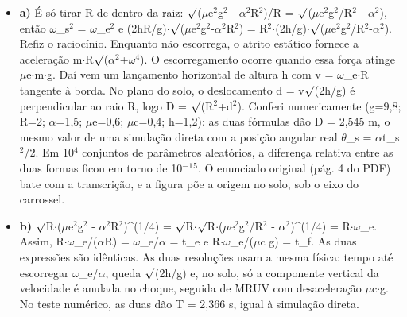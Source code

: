 \documentclass{article}%
\begin{document}
\begin{itemize}%
\item%
\textbf{a)} É só tirar R de dentro da raiz: $\surd$($\mu$e$^2$g$^2$ - $\alpha$$^2$R$^2$)/R = $\surd$($\mu$e$^2$g$^2$/R$^2$ - $\alpha$$^2$), então $\omega$\_s$^2$ = $\omega$\_e$^2$ e (2hR/g)$\cdot$$\surd$($\mu$e$^2$g$^2$-$\alpha$$^2$R$^2$) = R$^2$$\cdot$(2h/g)$\cdot$$\surd$($\mu$e$^2$g$^2$/R$^2$-$\alpha$$^2$). Refiz o raciocínio. Enquanto não escorrega, o atrito estático fornece a aceleração m$\cdot$R$\surd$($\alpha$$^2$+$\omega$$^{4}$). O escorregamento ocorre quando essa força atinge $\mu$e$\cdot$m$\cdot$g. Daí vem um lançamento horizontal de altura h com v = $\omega$\_e$\cdot$R tangente à borda. No plano do solo, o deslocamento d = v$\surd$(2h/g) é perpendicular ao raio R, logo D = $\surd$(R$^2$+d$^2$). Conferi numericamente (g=9,8; R=2; $\alpha$=1,5; $\mu$e=0,6; $\mu$c=0,4; h=1,2): as duas fórmulas dão D = 2,545 m, o mesmo valor de uma simulação direta com a posição angular real $\theta$\_s = $\alpha$t\_s$^2$/2. Em 10$^{4}$ conjuntos de parâmetros aleatórios, a diferença relativa entre as duas formas ficou em torno de 10$^{-}$$^{1}$$^{5}$. O enunciado original (pág. 4 do PDF) bate com a transcrição, e a figura põe a origem no solo, sob o eixo do carrossel.%
\item%
\textbf{b)} $\surd$R$\cdot$($\mu$e$^2$g$^2$ - $\alpha$$^2$R$^2$)\^{}(1/4) = $\surd$R$\cdot$$\surd$R$\cdot$($\mu$e$^2$g$^2$/R$^2$ - $\alpha$$^2$)\^{}(1/4) = R$\cdot$$\omega$\_e. Assim, R$\cdot$$\omega$\_e/($\alpha$R) = $\omega$\_e/$\alpha$ = t\_e e R$\cdot$$\omega$\_e/($\mu$c g) = t\_f. As duas expressões são idênticas. As duas resoluções usam a mesma física: tempo até escorregar $\omega$\_e/$\alpha$, queda $\surd$(2h/g) e, no solo, só a componente vertical da velocidade é anulada no choque, seguida de MRUV com desaceleração $\mu$c$\cdot$g. No teste numérico, as duas dão T = 2,366 s, igual à simulação direta.%
\end{itemize}%
\end{document}
